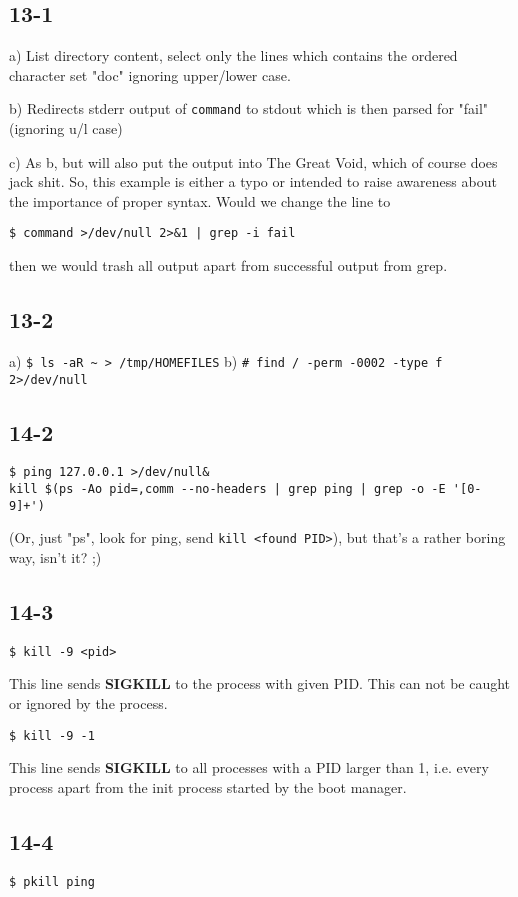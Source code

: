 \subsection{13-1}
a) List directory content, select only the lines which contains the ordered character set "doc" ignoring upper/lower case.

b) Redirects stderr output of \verb=command= to stdout which is then parsed for "fail" (ignoring u/l case)

c) As b, but will also put the output into The Great Void, which of course does jack shit. So, this example is either a typo or intended to raise awareness about the importance of proper syntax. Would we change the line to

\verb=$ command >/dev/null 2>&1 | grep -i fail=

then we would trash all output apart from successful output from grep.

\subsection{13-2}
a) \verb=$ ls -aR ~ > /tmp/HOMEFILES=
b) \verb=# find / -perm -0002 -type f 2>/dev/null=

\subsection{14-2}
\begin{verbatim}
$ ping 127.0.0.1 >/dev/null&
kill $(ps -Ao pid=,comm --no-headers | grep ping | grep -o -E '[0-9]+')
\end{verbatim}
(Or, just "ps", look for ping, send \verb=kill <found PID>=), but that's a rather boring way, isn't it? ;)

\subsection{14-3}
\verb=$ kill -9 <pid>=

This line sends \textbf{SIGKILL} to the process with given PID. This can not be caught or ignored by the process.

\verb=$ kill -9 -1=

This line sends \textbf{SIGKILL} to all processes with a PID larger than 1, i.e. every process apart from the init process started by the boot manager.

\subsection{14-4}
\verb=$ pkill ping=

